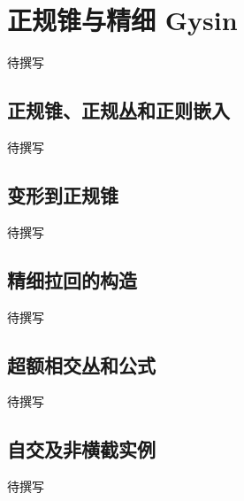 
% 
% 

\section{正规锥与精细 Gysin}
\label{g5:sec:2704}

待撰写

\subsection{正规锥、正规丛和正则嵌入}
\label{g5:subsec:2704:01}
待撰写

\subsection{变形到正规锥}
\label{g5:subsec:2704:02}
待撰写

\subsection{精细拉回的构造}
\label{g5:subsec:2704:03}
待撰写

\subsection{超额相交丛和公式}
\label{g5:subsec:2704:04}
待撰写

\subsection{自交及非横截实例}
\label{g5:subsec:2704:05}
待撰写
